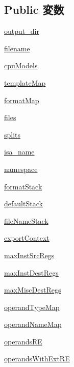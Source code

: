 \subsection*{Public 変数}
\begin{DoxyCompactItemize}
\item 
\hyperlink{classisa__parser_1_1ISAParser_af13822e7445276926ee9fbb9b72e8814}{output\_\-dir}
\item 
\hyperlink{classisa__parser_1_1ISAParser_a2ff994e16bf9521154de4cf659a3b689}{filename}
\item 
\hyperlink{classisa__parser_1_1ISAParser_a4abb53d2c2aba2ec9f44d171ede05d9b}{cpuModels}
\item 
\hyperlink{classisa__parser_1_1ISAParser_a8f9d77287cb0e12c8509c43b57a1ad6a}{templateMap}
\item 
\hyperlink{classisa__parser_1_1ISAParser_a26c1f4da902875f55b28102821e04ba7}{formatMap}
\item 
\hyperlink{classisa__parser_1_1ISAParser_afafecb95aca5e0525fd6959a5602fb89}{files}
\item 
\hyperlink{classisa__parser_1_1ISAParser_a001ef9e857118ccf6a7720cdc2f8e61e}{splits}
\item 
\hyperlink{classisa__parser_1_1ISAParser_a12f634d9b61a4ef844dd9b16754fc1a6}{isa\_\-name}
\item 
\hyperlink{classisa__parser_1_1ISAParser_ac81e8ddb117887e9a7851c86e4e56b58}{namespace}
\item 
\hyperlink{classisa__parser_1_1ISAParser_aefbd0c3e5f337cbfd57bb1b06e2d3239}{formatStack}
\item 
\hyperlink{classisa__parser_1_1ISAParser_a499c7a7828f387354bc375158ad909ab}{defaultStack}
\item 
\hyperlink{classisa__parser_1_1ISAParser_a3bbd8b3b7ba5708696c11b10adb04363}{fileNameStack}
\item 
\hyperlink{classisa__parser_1_1ISAParser_aa90de695345ff83236251d449b00acbb}{exportContext}
\item 
\hyperlink{classisa__parser_1_1ISAParser_aae536271bc0abb193947fbef19ed65ec}{maxInstSrcRegs}
\item 
\hyperlink{classisa__parser_1_1ISAParser_aaf95d12fb4ffaf5597a04acc00608664}{maxInstDestRegs}
\item 
\hyperlink{classisa__parser_1_1ISAParser_ac9a78457bddda64dbfeac91ca4d4515f}{maxMiscDestRegs}
\item 
\hyperlink{classisa__parser_1_1ISAParser_ad3e84868e5c2e3489013b0d82a24a542}{operandTypeMap}
\item 
\hyperlink{classisa__parser_1_1ISAParser_a1c431ef0bd4ef361ae285be0fcd407cc}{operandNameMap}
\item 
\hyperlink{classisa__parser_1_1ISAParser_a50d6b31071f0e367e77a800b74e23597}{operandsRE}
\item 
\hyperlink{classisa__parser_1_1ISAParser_aaec16aa162d09bb2f175546875093b47}{operandsWithExtRE}
\end{DoxyCompactItemize}
